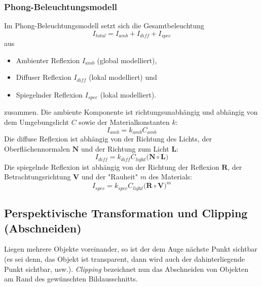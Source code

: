 \documentclass[a4paper, 11pt, accentcolor = tud3b]{tudreport}
\newcommand{\mat}[1]{\boldsymbol{#1}}
\renewcommand{\vec}[1]{\boldsymbol{\mathbf{#1}}}
\begin{document}
				\subsubsection{Phong-Beleuchtungsmodell}
					Im Phong-Beleuchtungsmodell setzt sich die Gesamtbeleuchtung
					\begin{equation*}
						I_\textit{total} = I_\textit{amb} + I_\textit{diff} + I_\textit{spec}
					\end{equation*}
					aus
					\begin{itemize}
						\item Ambienter Reflexion \( I_\textit{amb} \) (global modelliert),
						\item Diffuser Reflexion \( I_\textit{diff} \) (lokal modelliert) und
						\item Spiegelnder Reflexion \( I_\textit{spec} \) (lokal modelliert).
					\end{itemize}
					zusammen. Die ambiente Komponente ist richtungsunabhängig und abhängig von dem Umgebungslicht \(C\) sowie der Materialkonstanten \(k\):
					\begin{equation*}
						I_\textit{amb} = k_\textit{amb} C_\textit{amb}
					\end{equation*}
					Die diffuse Reflexion ist abhängig von der Richtung des Lichts, der Oberflächennormalen \( \vec{N} \) und der Richtung zum Licht \( \vec{L} \):
					\begin{equation*}
						I_\textit{diff} = k_\textit{diff} C_\textit{light} \big( \vec{N} \circ \vec{L} \big)
					\end{equation*}
					Die spiegelnde Reflexion ist abhängig von der Richtung der Reflexion \( \vec{R} \), der Betrachtungsrichtung \( \mat{V} \) und der "Rauheit" \(m\) des Materials:
					\begin{equation*}
						I_\textit{spec} = k_\textit{spec} C_\textit{light} \big( \vec{R} \circ \vec{V} \big)^m
					\end{equation*}

			\subsection{Perspektivische Transformation und Clipping (Abschneiden)}
				Liegen mehrere Objekte voreinander, so ist der dem Auge nächste Punkt sichtbar (es sei denn, das Objekt ist transparent, dann wird auch der dahinterliegende Punkt sichtbar, usw.). \emph{Clipping} bezeichnet nun das Abschneiden von Objekten am Rand des gewünschten Bildausschnitts.
\end{document}
